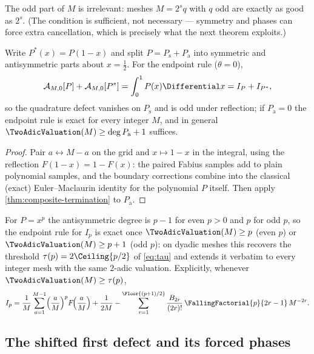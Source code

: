 The odd part of $M$ is irrelevant: meshes $M=2^{s}q$ with $q$ odd are
exactly as good as $2^{s}$.  (The condition is sufficient, not
necessary --- symmetry and phases can force extra cancellation, which
is precisely what the next theorem exploits.)

\begin{theorem}
\label{thm:reflection-reduction}
Write $P^*(x)=P(1-x)$ and split
$P=P_{\mathrm s}+P_{\mathrm a}$ into symmetric and antisymmetric parts
about $x=\tfrac12$.  For the endpoint rule ($\theta=0$),
\begin{equation}
 \mathcal A_{M,0}[P]+\mathcal A_{M,0}[P^*]=\int_0^1P(x)\Differential x
 =I_P+I_{P^*},
 \label{eq:reflection-pair}
\end{equation}
so the quadrature defect vanishes on $P_{\mathrm s}$ and is odd under
reflection; if $P_{\mathrm a}=0$ the endpoint rule is exact for every
integer $M$, and in general
$\TwoAdicValuation(M)\ge\deg P_{\mathrm a}+1$ suffices.
\end{theorem}

\begin{proof}
Pair $a\leftrightarrow M-a$ on the grid and $x\mapsto1-x$ in the
integral, using the reflection $F(1-x)=1-F(x)$: the paired Fabius
samples add to plain polynomial samples, and the boundary corrections
combine into the classical (exact) Euler--Maclaurin identity for the
polynomial $P$ itself.  Then apply \cref{thm:composite-termination}
to $P_{\mathrm a}$.
\end{proof}

For $P=x^{p}$ the antisymmetric degree is $p-1$ for even $p>0$ and $p$
for odd $p$, so the endpoint rule for $I_p$ is exact once
$\TwoAdicValuation(M)\ge p$ (even $p$) or $\TwoAdicValuation(M)\ge p+1$ (odd $p$): on dyadic
meshes this recovers the threshold $\tau(p)=2\Ceiling{p/2}$ of
\eqref{eq:tau} and extends it verbatim to every integer mesh with the
same $2$-adic valuation.  Explicitly, whenever
$\TwoAdicValuation(M)\ge\tau(p)$,
\begin{equation}
 I_p=\frac1M\sum_{a=1}^{M-1}\Bigl(\frac aM\Bigr)^{p}
 F\!\Bigl(\frac aM\Bigr)
 +\frac1{2M}
 -\sum_{r=1}^{\Floor{(p+1)/2}}
 \frac{B_{2r}}{(2r)!}\,\FallingFactorial{p}{2r-1}\,M^{-2r}.
 \label{eq:Ip-composite}
\end{equation}

\subsection{The shifted first defect and its forced phases}

